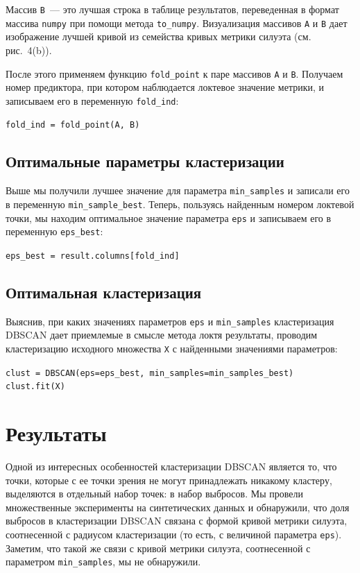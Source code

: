 \documentclass[a4paper,12pt]{article}
\begin{document}
\medskip\noindent
Массив \texttt{B} — это лучшая строка в таблице результатов, переведенная в формат массива \texttt{numpy} при помощи метода \texttt{to\_numpy}. Визуализация массивов \texttt{A} и \texttt{B} дает изображение лучшей кривой из семейства кривых метрики силуэта (см. рис. 4(b)).

После этого применяем функцию \texttt{fold\_point} к паре массивов \texttt{A} и \texttt{B}. Получаем номер предиктора, при котором наблюдается локтевое значение метрики, и записываем его в переменную \texttt{fold\_ind}:

\medskip\noindent
\texttt{fold\_ind = fold\_point(A, B)}


\subsection{Оптимальные параметры кластеризации}


Выше мы получили лучшее значение для параметра \texttt{min\_samples} и записали его в переменную \texttt{min\_sample\_best}. Теперь, пользуясь найденным номером локтевой точки, мы находим оптимальное значение параметра \texttt{eps} и записываем его в переменную \texttt{eps\_best}:

\medskip\noindent
\texttt{eps\_best = result.columns[fold\_ind]}

\subsection{Оптимальная кластеризация}


Выяснив, при каких значениях параметров \texttt{eps} и \texttt{min\_samples} кластеризация DBSCAN дает приемлемые в смысле метода локтя результаты, проводим кластеризацию исходного множества \texttt{X} с найденными значениями параметров:

\medskip\noindent
\texttt{clust = DBSCAN(eps=eps\_best, min\_samples=min\_samples\_best)\\
clust.fit(X)
}\texttt{}


\section{Результаты}

Одной из интересных особенностей кластеризации DBSCAN является то, что точки, которые с ее точки зрения не могут принадлежать никакому кластеру, выделяются в отдельный набор точек: в набор выбросов. Мы провели множественные эксперименты на синтетических данных и обнаружили, что доля выбросов в кластеризации DBSCAN связана с формой кривой метрики силуэта, соотнесенной с радиусом кластеризации (то есть, с величиной параметра \texttt{eps}). Заметим, что такой же связи с кривой метрики силуэта, соотнесенной с параметром \texttt{min\_samples}, мы не обнаружили.
\end{document}
